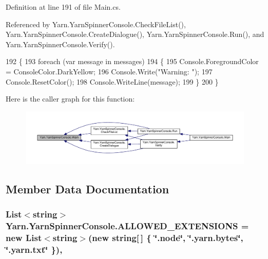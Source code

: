 Definition at line 191 of file Main.\-cs.



Referenced by Yarn.\-Yarn\-Spinner\-Console.\-Check\-File\-List(), Yarn.\-Yarn\-Spinner\-Console.\-Create\-Dialogue(), Yarn.\-Yarn\-Spinner\-Console.\-Run(), and Yarn.\-Yarn\-Spinner\-Console.\-Verify().


\begin{DoxyCode}
192         \{
193             \textcolor{keywordflow}{foreach} (var message \textcolor{keywordflow}{in} messages)
194             \{
195                 Console.ForegroundColor = ConsoleColor.DarkYellow;
196                 Console.Write(\textcolor{stringliteral}{"Warning: "});
197                 Console.ResetColor();
198                 Console.WriteLine(message);
199             \}
200         \}
\end{DoxyCode}


Here is the caller graph for this function\-:
\nopagebreak
\begin{figure}[H]
\begin{center}
\leavevmode
\includegraphics[width=350pt]{a00174_a979bb6f049b6c5294f745a19e24ddd9d_icgraph}
\end{center}
\end{figure}




\subsection{Member Data Documentation}
\hypertarget{a00174_a0979de7ea02c8c0375b8220a12e6575e}{
\subsubsection[{A\-L\-L\-O\-W\-E\-D\-\_\-\-E\-X\-T\-E\-N\-S\-I\-O\-N\-S}]{\setlength{\rightskip}{0pt plus 5cm}List$<$string$>$ Yarn.\-Yarn\-Spinner\-Console.\-A\-L\-L\-O\-W\-E\-D\-\_\-\-E\-X\-T\-E\-N\-S\-I\-O\-N\-S = new List$<$string$>$(new string\mbox{[}$\,$\mbox{]} \{ \char`\"{}.node\char`\"{}, \char`\"{}.yarn.\-bytes\char`\"{}, \char`\"{}.yarn.\-txt\char`\"{} \})\hspace{0.3cm}{\ttfamily [static]}, {\ttfamily [package]}}}\label{a00174_a0979de7ea02c8c0375b8220a12e6575e}


